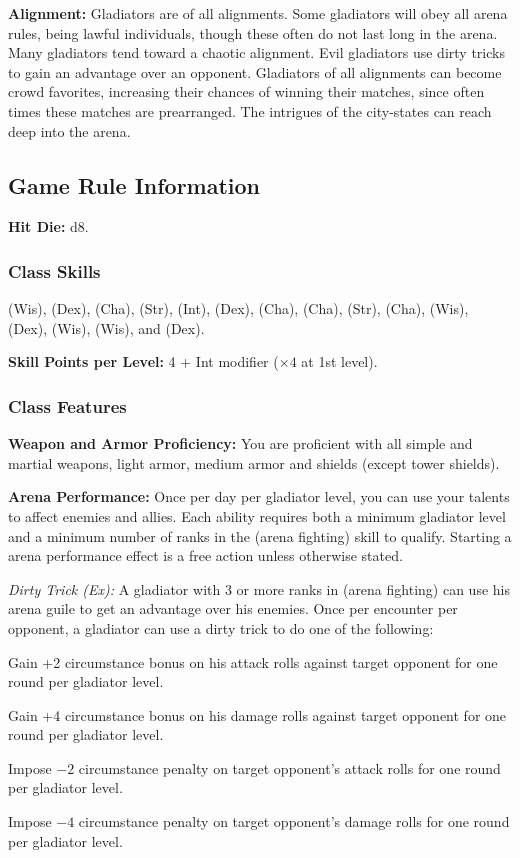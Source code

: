 \textbf{Alignment:} Gladiators are of all alignments. Some gladiators will obey all arena rules, being lawful individuals, though these often do not last long in the arena. Many gladiators tend toward a chaotic alignment. Evil gladiators use dirty tricks to gain an advantage over an opponent. Gladiators of all alignments can become crowd favorites, increasing their chances of winning their matches, since often times these matches are prearranged. The intrigues of the city-states can reach deep into the arena.

\subsection{Game Rule Information}
\textbf{Hit Die:} d8.

\subsubsection{Class Skills}
 (Wis),  (Dex),  (Cha),  (Str),  (Int),  (Dex),  (Cha),  (Cha),  (Str),  (Cha),  (Wis),  (Dex),  (Wis),  (Wis), and  (Dex).

\textbf{Skill Points per Level:} 4 + Int modifier ($\times4$ at 1st level).

\subsubsection{Class Features}
\textbf{Weapon and Armor Proficiency:} You are proficient with all simple and martial weapons, light armor, medium armor and shields (except tower shields).

\textbf{Arena Performance:} Once per day per gladiator level, you can use your talents to affect enemies and allies. Each ability requires both a minimum gladiator level and a minimum number of ranks in the  (arena fighting) skill to qualify. Starting a arena performance effect is a free action unless otherwise stated.

\textit{Dirty Trick (Ex):} A gladiator with 3 or more ranks in  (arena fighting) can use his arena guile to get an advantage over his enemies. Once per encounter per opponent, a gladiator can use a dirty trick to do one of the following:

\begin{itemize*}
\item Gain +2 circumstance bonus on his attack rolls against target opponent for one round per gladiator level.
\item Gain +4 circumstance bonus on his damage rolls against target opponent for one round per gladiator level.
\item Impose $-2$ circumstance penalty on target opponent's attack rolls for one round per gladiator level.
\item Impose $-4$ circumstance penalty on target opponent's damage rolls for one round per gladiator level.
\end{itemize*}

